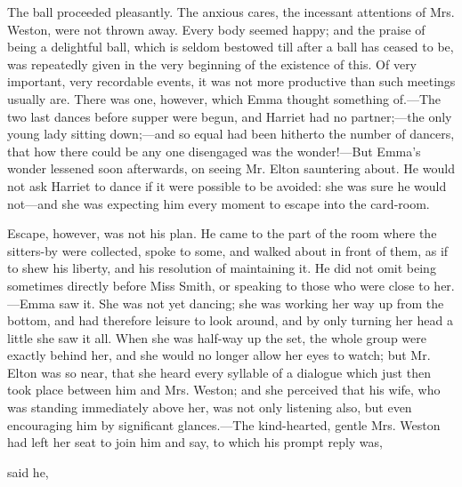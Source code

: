 The ball proceeded pleasantly. The anxious cares, the incessant attentions of Mrs. Weston, were not thrown away. Every body seemed happy; and the praise of being a delightful ball, which is seldom bestowed till after a ball has ceased to be, was repeatedly given in the very beginning of the existence of this. Of very important, very recordable events, it was not more productive than such meetings usually are. There was one, however, which Emma thought something of.---The two last dances before supper were begun, and Harriet had no partner;---the only young lady sitting down;---and so equal had been hitherto the number of dancers, that how there could be any one disengaged was the wonder!---But Emma's wonder lessened soon afterwards, on seeing Mr. Elton sauntering about. He would not ask Harriet to dance if it were possible to be avoided: she was sure he would not---and she was expecting him every moment to escape into the card-room.

Escape, however, was not his plan. He came to the part of the room where the sitters-by were collected, spoke to some, and walked about in front of them, as if to shew his liberty, and his resolution of maintaining it. He did not omit being sometimes directly before Miss Smith, or speaking to those who were close to her.---Emma saw it. She was not yet dancing; she was working her way up from the bottom, and had therefore leisure to look around, and by only turning her head a little she saw it all. When she was half-way up the set, the whole group were exactly behind her, and she would no longer allow her eyes to watch; but Mr. Elton was so near, that she heard every syllable of a dialogue which just then took place between him and Mrs. Weston; and she perceived that his wife, who was standing immediately above her, was not only listening also, but even encouraging him by significant glances.---The kind-hearted, gentle Mrs. Weston had left her seat to join him and say,  to which his prompt reply was, 


 said he, 

